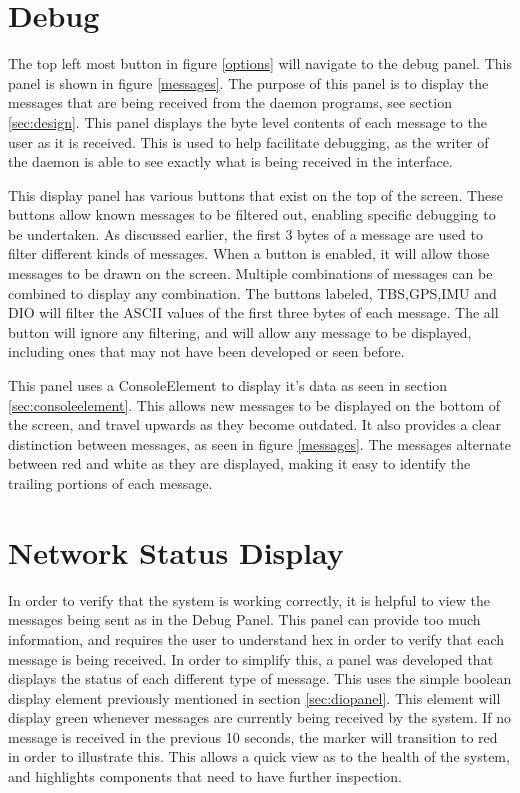 

\section{Debug}

The top left most button in figure \ref{options} will navigate to the debug panel. This panel is shown in figure \ref{messages}. The purpose of this panel is to display the messages that are being received from the daemon programs, see section \ref{sec:design}. This panel displays the byte level contents of each message to the user as it is received. This is used to help facilitate debugging, as the writer of the daemon is able to see exactly what is being received in the interface.


This display panel has various buttons that exist on the top of the screen. These buttons allow known messages to be filtered out, enabling specific debugging to be undertaken. As discussed earlier, the first 3 bytes of a message are used to filter different kinds of messages. When a button is enabled, it will allow those messages to be drawn on the screen. Multiple combinations of messages can be combined to display any combination. The buttons labeled, TBS,GPS,IMU and DIO will filter the ASCII values of the first three bytes of each message. The all button will ignore any filtering, and will allow any message to be displayed, including ones that may not have been developed or seen before.

This panel uses a ConsoleElement to display it's data as seen in section \ref{sec:consoleelement}. This allows new messages to be displayed on the bottom of the screen, and travel upwards as they become outdated. It also provides a clear distinction between messages, as seen in figure \ref{messages}. The messages alternate between red and white as they are displayed, making it easy to identify the trailing portions of each message.

\section{Network Status Display}

In order to verify that the system is working correctly, it is helpful to view the messages being sent as in the Debug Panel. This panel can provide too much information, and requires the user to understand hex in order to verify that each message is being received. In order to simplify this, a panel was developed that displays the status of each different type of message. This uses the simple boolean display element previously mentioned in section \ref{sec:diopanel}. This element will display green whenever messages are currently being received by the system. If no message is received in the previous 10 seconds, the marker will transition to red in order to illustrate this. This allows a quick view as to the health of the system, and highlights components that need to have further inspection.

